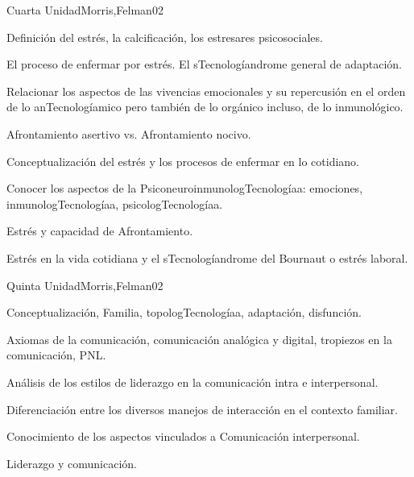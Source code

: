 \begin{syllabus}
\begin{unit}{Cuarta Unidad}{Morris,Felman}{0}{2}
\begin{topics}
	\item Definición del estrés, la calcificación, los estresares psicosociales.
	\item El proceso de enfermar por estrés. El sTecnologíandrome general de adaptación.
	\item Relacionar los aspectos de las vivencias emocionales y su repercusión en el orden de lo anTecnologíamico pero también de lo orgánico incluso, de lo inmunológico.
	\item Afrontamiento asertivo vs. Afrontamiento nocivo.
\end{topics}
\begin{unitgoals}
	\item Conceptualización del estrés y los procesos de enfermar en lo cotidiano.
	\item Conocer los aspectos de la PsiconeuroinmunologTecnologíaa: emociones, inmunologTecnologíaa, psicologTecnologíaa.
	\item Estrés y capacidad de Afrontamiento.
	\item Estrés en la vida cotidiana y el sTecnologíandrome del Bournaut o estrés laboral.
\end{unitgoals}
\end{unit}

\begin{unit}{Quinta Unidad}{Morris,Felman}{0}{2}
\begin{topics}
	\item Conceptualización, Familia, topologTecnologíaa, adaptación, disfunción.
	\item Axiomas de la comunicación, comunicación analógica y digital, tropiezos en la comunicación, PNL.
	\item Análisis de los estilos de liderazgo en la comunicación intra e interpersonal.
\end{topics}
\begin{unitgoals}
	\item Diferenciación entre los diversos manejos de interacción en el contexto familiar.
	\item Conocimiento de los aspectos vinculados a Comunicación interpersonal.
	\item Liderazgo y comunicación.
\end{unitgoals}
\end{unit}


\end{syllabus}
